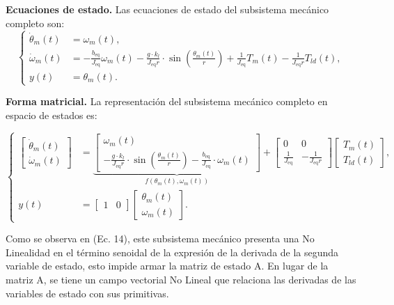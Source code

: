 \documentclass{article}
\begin{document}
\textbf{Ecuaciones de estado.}
Las ecuaciones de estado del subsistema mecánico completo son:
\begin{equation}
\left\{
\begin{aligned}
    \dot{\theta}_m(t) &= \omega_m(t), \\
    \dot{\omega}_m(t) &= -\frac{b_{\text{eq}}}{J_{\text{eq}}} \omega_m(t) - \frac{g \cdot k_l}{J_{\text{eq}} r} \cdot \sin\left(\frac{\theta_m(t)}{r}\right) + \frac{1}{J_{\text{eq}}} T_m(t) - \frac{1}{J_{\text{eq}} r} T_{ld}(t), \\
    y(t) &= \theta_m(t).
\end{aligned}
\right.
\end{equation}

\textbf{Forma matricial.}
La representación del subsistema mecánico completo en espacio de estados es:


\begin{equation}
\left\{
\begin{aligned}
\begin{bmatrix}
    \dot{\theta}_m(t) \\
    \dot{\omega}_m(t)
\end{bmatrix}
&=
\underbrace{
\begin{bmatrix}
    \omega_m(t) \\
    -\frac{g \cdot k_l}{J_{\text{eq}} r} \cdot \sin\left(\frac{\theta_m(t)}{r}\right) -\frac{b_{\text{eq}}}{J_{\text{eq}}} \cdot \omega_m(t) 
\end{bmatrix}
}_{f(\theta_m(t),\omega_m(t))}
+
\begin{bmatrix}
    0 & 0 \\
    \frac{1}{J_{\text{eq}}} & -\frac{1}{J_{\text{eq}} r}
\end{bmatrix}
\begin{bmatrix}
    T_m(t) \\
    T_{ld}(t)
\end{bmatrix}, \\
y(t) &=
\begin{bmatrix}
    1 & 0
\end{bmatrix}
\begin{bmatrix}
    \theta_m(t) \\
    \omega_m(t)
\end{bmatrix}.
\end{aligned}
\right.
\end{equation}

Como se observa en (Ec. 14), este subsistema mecánico presenta una No Linealidad en el término senoidal de la expresión de la derivada de la segunda variable de estado, esto impide armar la matriz de estado A. En lugar de la matriz A, se tiene un campo vectorial No Lineal que relaciona las derivadas de las variables de estado con sus primitivas.
\end{document}
